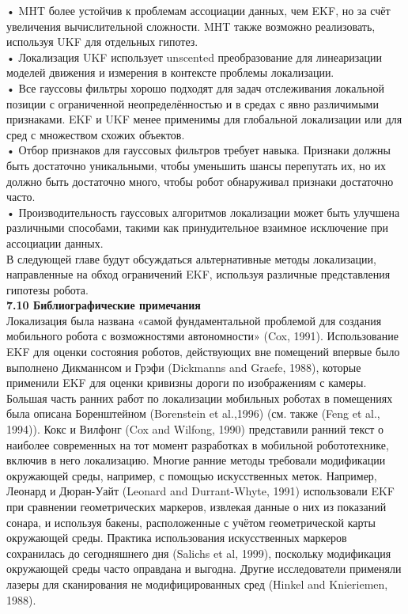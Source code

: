 \documentclass[10pt,a4paper]{article}
\begin{document}
• MHT более устойчив к проблемам ассоциации данных, чем EKF, но за счёт увеличения вычислительной сложности. MHT также возможно реализовать, используя UKF для отдельных гипотез.\\

• Локализация UKF использует unscented преобразование для линеаризации моделей движения и измерения в контексте проблемы локализации.\\

• Все гауссовы фильтры хорошо подходят для задач отслеживания локальной позиции с ограниченной неопределённостью и в средах с явно различимыми признаками. EKF и UKF менее применимы для глобальной локализации или для сред с множеством схожих объектов. \\

• Отбор признаков для гауссовых фильтров требует навыка. Признаки должны быть достаточно уникальными, чтобы уменьшить шансы перепутать их, но их должно быть достаточно много, чтобы робот  обнаруживал признаки достаточно часто. \\

• Производительность гауссовых алгоритмов локализации может быть улучшена различными способами, такими как принудительное взаимное исключение при ассоциации данных. \\

В следующей главе будут обсуждаться альтернативные методы локализации, направленные на обход ограничений EKF, используя различные представления гипотезы робота. \\

\textbf{7.10 Библиографические примечания}\\

Локализация была названа «самой фундаментальной проблемой для создания мобильного робота с возможностями автономности» (Cox, 1991). Использование EKF для оценки состояния роботов, действующих вне помещений впервые было выполнено Дикманнсом и Грэфи (Dickmanns and Graefe, 1988), которые применили EKF для оценки кривизны дороги по изображениям с камеры. Большая часть ранних работ по локализации мобильных роботах в помещениях была описана Боренштейном (Borenstein et al.,1996) (см. также (Feng et al., 1994)). Кокс и Вилфонг (Cox and Wilfong, 1990) представили ранний текст о наиболее современных на тот момент разработках в мобильной робототехнике, включив в него локализацию. Многие ранние методы требовали модификации окружающей среды, например, с помощью искусственных меток. Например, Леонард и Дюран-Уайт (Leonard and Durrant-Whyte, 1991) использовали EKF при сравнении геометрических маркеров, извлекая данные о них из показаний сонара, и используя бакены, расположенные с учётом геометрической карты окружающей среды. Практика использования искусственных маркеров сохранилась до сегодняшнего дня (Salichs et al, 1999), поскольку  модификация окружающей среды часто оправдана и выгодна. Другие исследователи применяли лазеры для сканирования не модифицированных сред (Hinkel and Knieriemen, 1988).
\end{document}

